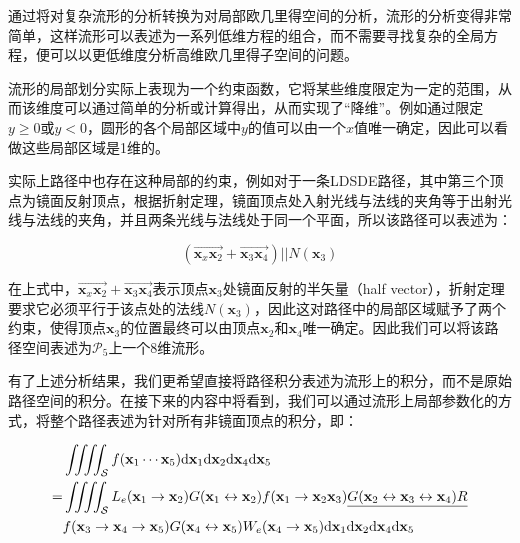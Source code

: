 通过将对复杂流形的分析转换为对局部欧几里得空间的分析，流形的分析变得非常简单，这样流形可以表述为一系列低维方程的组合，而不需要寻找复杂的全局方程，便可以以更低维度分析高维欧几里得子空间的问题。

流形的局部划分实际上表现为一个约束函数，它将某些维度限定为一定的范围，从而该维度可以通过简单的分析或计算得出，从而实现了“降维”。例如通过限定$y\geq 0$或$y<0$，圆形的各个局部区域中$y$的值可以由一个$x$值唯一确定，因此可以看做这些局部区域是1维的。

实际上路径中也存在这种局部的约束，例如对于一条LDSDE路径，其中第三个顶点为镜面反射顶点，根据折射定理，镜面顶点处入射光线与法线的夹角等于出射光线与法线的夹角，并且两条光线与法线处于同一个平面，所以该路径可以表述为：

\begin{equation}
	(\overrightarrow {\mathbf{x}_x\mathbf{x}_2}+\overrightarrow{\mathbf{x}_3\mathbf{x}_4})||N(\mathbf{x}_3)
\end{equation}

\noindent 在上式中，$\overrightarrow {\mathbf{x}_x\mathbf{x}_2}+\overrightarrow{\mathbf{x}_3\mathbf{x}_4}$表示顶点$\mathbf{x}_3$处镜面反射的半矢量（half vector），折射定理要求它必须平行于该点处的法线$N(\mathbf{x}_3)$，因此这对路径中的局部区域赋予了两个约束，使得顶点$\mathbf{x}_3$的位置最终可以由顶点$\mathbf{x}_2$和$\mathbf{x}_4$唯一确定。因此我们可以将该路径空间表述为$\mathcal{P}_5$上一个8维流形。

有了上述分析结果，我们更希望直接将路径积分表述为流形上的积分，而不是原始路径空间的积分。在接下来的内容中将看到，我们可以通过流形上局部参数化的方式，将整个路径表述为针对所有非镜面顶点的积分，即：

\begin{equation}\label{e:mlt-integral-on-manifold}
\begin{aligned}
	&\iiiint_{\mathcal{S}}f(\mathbf{x}_1\cdots\mathbf{x}_5){\rm d}\mathbf{x}_1{\rm d}\mathbf{x}_2{\rm d}\mathbf{x}_4{\rm d}\mathbf{x}_5\\
	=&\iiiint_{\mathcal{S}}L_e(\mathbf{x}_1\to\mathbf{x}_2)G(\mathbf{x}_1\leftrightarrow\mathbf{x}_2)f(\mathbf{x}_1\to\mathbf{x}_2\mathbf{x}_3)\underline{G(\mathbf{x}_2\leftrightarrow\mathbf{x}_3\leftrightarrow\mathbf{x}_4)R}\\
	&f(\mathbf{x}_3\to\mathbf{x}_4\to\mathbf{x}_5)G(\mathbf{x}_4\leftrightarrow\mathbf{x}_5)W_e(\mathbf{x}_4\to\mathbf{x}_5){\rm d}\mathbf{x}_1{\rm d}\mathbf{x}_2{\rm d}\mathbf{x}_4{\rm d}\mathbf{x}_5
\end{aligned}
\end{equation}

